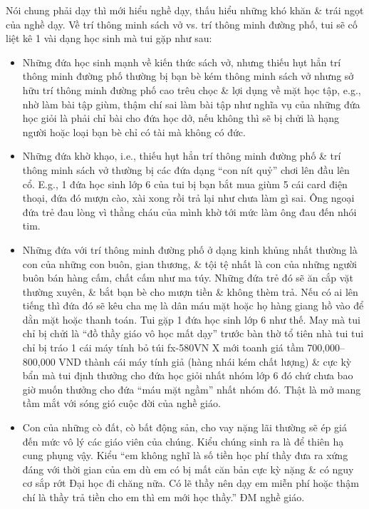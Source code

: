 \documentclass[12pt,oneside]{book}
\begin{document}
Nói chung phải dạy thì mới hiểu nghề dạy, thấu hiểu những khó khăn \& trái ngọt của nghề dạy. Về trí thông minh sách vở vs. trí thông minh đường phố, tui sẽ cố liệt kê 1 vài dạng học sinh mà tui gặp như sau:
\begin{itemize}
	\item Những đứa học sinh mạnh về kiến thức sách vở, nhưng thiếu hụt hẳn trí thông minh đường phố thường bị bạn bè kém thông minh sách vở nhưng sở hữu trí thông minh đường phố cao trêu chọc \& lợi dụng về mặt học tập, e.g., nhờ làm bài tập giùm, thậm chí sai làm bài tập như nghĩa vụ của những đứa học giỏi là phải chỉ bài cho đứa học dở, nếu không thì sẽ bị chửi là hạng người hoặc loại bạn bè chỉ có tài mà không có đức.
	\item Những đứa khờ khạo, i.e., thiếu hụt hẳn trí thông minh đường phố \& trí thông minh sách vở thường bị các đứa dạng ``con nít quỷ'' chơi lên đầu lên cổ. E.g., 1 đứa học sinh lớp 6 của tui bị bạn bắt mua giùm 5 cái card điện thoại, đứa đó mượn cào, xài xong rồi trả lại như chưa làm gì sai. Ông ngoại đứa trẻ đau lòng vì thằng cháu của mình khờ tới mức làm ông đau đến nhói tim.
	\item Những đứa với trí thông minh đường phố ở dạng kinh khủng nhất thường là con của những con buôn, gian thương, \& tội tệ nhất là con của những người buôn bán hàng cấm, chất cấm như ma túy. Những đứa trẻ đó sẽ ăn cắp vặt thường xuyên, \& bắt bạn bè cho mượn tiền \& không thèm trả. Nếu có ai lên tiếng thì đứa đó sẽ kêu cha mẹ là dân máu mặt hoặc họ hàng giang hồ vào để dằn mặt hoặc thanh toán. Tui gặp 1 đứa học sinh lớp 6 như thế. May mà tui chỉ bị chửi là ``đồ thầy giáo vô học mất dạy'' trước bàn thờ tổ tiên nhà tui tui chỉ bị tráo 1 cái máy tính bỏ túi fx-580VN X mới toanh giá tầm 700,000--800,000 VND thành cái máy tính giả (hàng nhái kém chất lượng) \& cực kỳ bẩn mà tui định thưởng cho đứa học giỏi nhất nhóm lớp 6 đó chứ chưa bao giờ muốn thưởng cho đứa ``máu mặt ngầm'' nhất nhóm đó. Thật là mở mang tầm mắt với sóng gió cuộc đời của nghề giáo.
	\item Con của những cò đất, cò bất động sản, cho vay nặng lãi thường sẽ ép giá đến mức vô lý các giáo viên của chúng. Kiểu chúng sinh ra là để thiên hạ cung phụng vậy. Kiểu ``em không nghĩ là số tiền học phí thầy đưa ra xứng đáng với thời gian của em dù em có bị mất căn bản cực kỳ nặng \& có nguy cơ sắp rớt Đại học đi chăng nữa. Có lẽ thầy nên dạy em miễn phí hoặc thậm chí là thầy trả tiền cho em thì em mới học thầy.'' ĐM nghề giáo.
\end{itemize}
\end{document}
